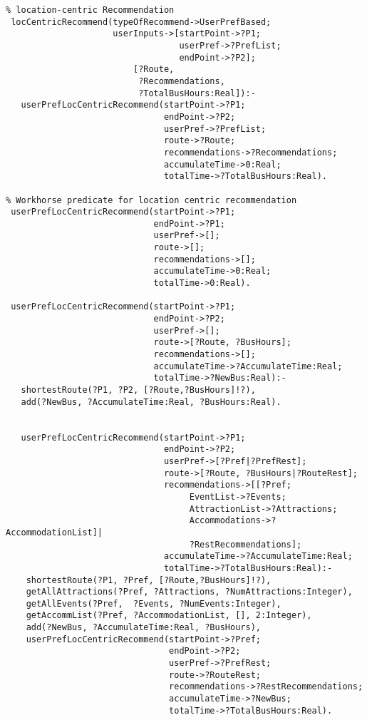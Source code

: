 \begin{verbatim}
% location-centric Recommendation
 locCentricRecommend(typeOfRecommend->UserPrefBased;
                     userInputs->[startPoint->?P1;
                                  userPref->?PrefList;
                                  endPoint->?P2];
                         [?Route, 
                          ?Recommendations,
                          ?TotalBusHours:Real]):-
   userPrefLocCentricRecommend(startPoint->?P1;
                               endPoint->?P2;
                               userPref->?PrefList;
                               route->?Route; 
                               recommendations->?Recommendations;
                               accumulateTime->0:Real;
                               totalTime->?TotalBusHours:Real).
                           
% Workhorse predicate for location centric recommendation                        
 userPrefLocCentricRecommend(startPoint->?P1;
                             endPoint->?P1;
                             userPref->[];
                             route->[]; 
                             recommendations->[];
                             accumulateTime->0:Real;
                             totalTime->0:Real).
 
 userPrefLocCentricRecommend(startPoint->?P1;
                             endPoint->?P2;
                             userPref->[];
                             route->[?Route, ?BusHours]; 
                             recommendations->[];
                             accumulateTime->?AccumulateTime:Real;
                             totalTime->?NewBus:Real):-
   shortestRoute(?P1, ?P2, [?Route,?BusHours]!?),
   add(?NewBus, ?AccumulateTime:Real, ?BusHours:Real).

    
   userPrefLocCentricRecommend(startPoint->?P1;
                               endPoint->?P2;
                               userPref->[?Pref|?PrefRest];
                               route->[?Route, ?BusHours|?RouteRest]; 
                               recommendations->[[?Pref;
                                    EventList->?Events;
                                    AttractionList->?Attractions;
                                    Accommodations->?AccommodationList]|
                                    ?RestRecommendations];
                               accumulateTime->?AccumulateTime:Real;
                               totalTime->?TotalBusHours:Real):-
    shortestRoute(?P1, ?Pref, [?Route,?BusHours]!?),
    getAllAttractions(?Pref, ?Attractions, ?NumAttractions:Integer),
    getAllEvents(?Pref,  ?Events, ?NumEvents:Integer),
    getAccommList(?Pref, ?AccommodationList, [], 2:Integer),
    add(?NewBus, ?AccumulateTime:Real, ?BusHours),
    userPrefLocCentricRecommend(startPoint->?Pref;
                                endPoint->?P2;
                                userPref->?PrefRest;
                                route->?RouteRest; 
                                recommendations->?RestRecommendations;
                                accumulateTime->?NewBus;
                                totalTime->?TotalBusHours:Real).                    
                                           

\end{verbatim}

